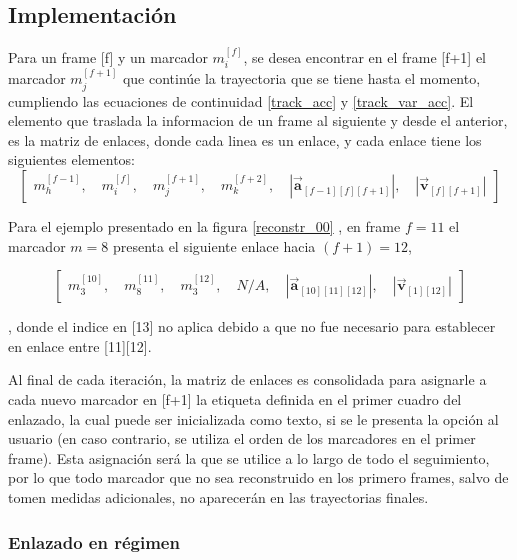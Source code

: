 \subsection{Implementación}

Para un frame [f] y un marcador $m_{i}^{[f]}$, se desea encontrar en el frame [f+1] el marcador $m_{j}^{[f+1]}$ que continúe la trayectoria que se tiene hasta el momento, cumpliendo las ecuaciones de continuidad \ref{track_acc} y \ref{track_var_acc}. El elemento que traslada la informacion de un frame al siguiente y desde el anterior, es la matriz de enlaces, donde cada linea es un enlace, y cada enlace tiene los siguientes elementos:
\begin{equation}
\begin{bmatrix}
  m_{h}^{[f-1]} ,\quad m_{i}^{[f]} ,\quad m_{j}^{[f+1]} ,\quad m_{k}^{[f+2]} ,\quad \left|\boldsymbol{\overrightarrow{a}}_{[f-1][f][f+1]}\right| ,\quad \left|\boldsymbol{\overrightarrow{v}}_{[f][f+1]}\right|
\end{bmatrix}
\end{equation}

Para el ejemplo presentado en la figura \ref{reconstr_00} , en frame $f=11$ el marcador $m=8$ presenta el siguiente enlace hacia $(f+1)=12$, 

\begin{equation}
\begin{bmatrix}
  m_{3}^{[10]} ,\quad m_{8}^{[11]} ,\quad m_{3}^{[12]} ,\quad N/A ,\quad \left|\boldsymbol{\overrightarrow{a}}_{[10][11][12]}\right| ,\quad \left|\boldsymbol{\overrightarrow{v}}_{[1][12]}\right|
\end{bmatrix}
\end{equation}

, donde el indice en [13] no aplica debido a que no fue necesario para establecer en enlace entre [11][12].

Al final de cada iteración, la matriz de enlaces es consolidada para asignarle a cada nuevo marcador en [f+1] la etiqueta definida en el primer cuadro del enlazado, la cual puede ser inicializada como texto, si se le presenta la opción al usuario (en caso contrario, se utiliza el orden de los marcadores en el primer frame). Esta asignación será la que se utilice a lo largo de todo el seguimiento, por lo que todo marcador que no sea reconstruido en los primero frames, salvo de tomen medidas adicionales, no aparecerán en las trayectorias finales.

\subsubsection{Enlazado en régimen}

